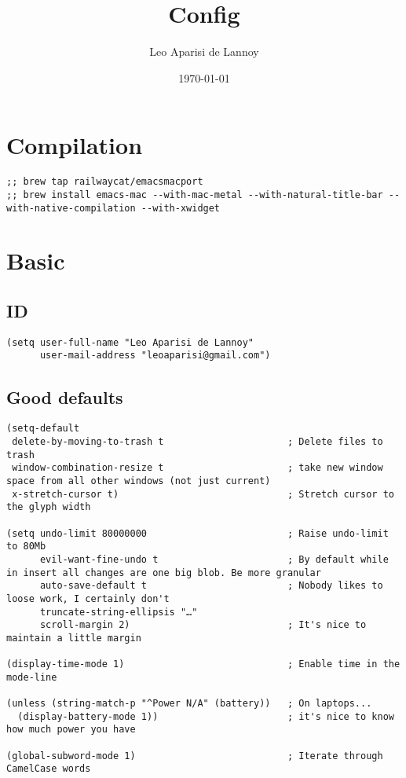 \documentclass[c]{article}
\author{Leo Aparisi de Lannoy}
\date{\today}
\title{Config}
\theoremstyle{plain}%
\theoremstyle{definition}
\theoremstyle{remark}
\begin{document}
\maketitle
\tableofcontents

\section{Compilation}
\label{sec:org3a205ec}
\begin{verbatim}
;; brew tap railwaycat/emacsmacport
;; brew install emacs-mac --with-mac-metal --with-natural-title-bar --with-native-compilation --with-xwidget
\end{verbatim}
\section{Basic}
\label{sec:org958c451}
\subsection{ID}
\label{sec:org32097e6}
\begin{verbatim}
(setq user-full-name "Leo Aparisi de Lannoy"
      user-mail-address "leoaparisi@gmail.com")
\end{verbatim}
\subsection{Good defaults}
\label{sec:org8eda141}
\begin{verbatim}
(setq-default
 delete-by-moving-to-trash t                      ; Delete files to trash
 window-combination-resize t                      ; take new window space from all other windows (not just current)
 x-stretch-cursor t)                              ; Stretch cursor to the glyph width

(setq undo-limit 80000000                         ; Raise undo-limit to 80Mb
      evil-want-fine-undo t                       ; By default while in insert all changes are one big blob. Be more granular
      auto-save-default t                         ; Nobody likes to loose work, I certainly don't
      truncate-string-ellipsis "…"
      scroll-margin 2)                            ; It's nice to maintain a little margin

(display-time-mode 1)                             ; Enable time in the mode-line

(unless (string-match-p "^Power N/A" (battery))   ; On laptops...
  (display-battery-mode 1))                       ; it's nice to know how much power you have

(global-subword-mode 1)                           ; Iterate through CamelCase words
\end{verbatim}
\end{document}
